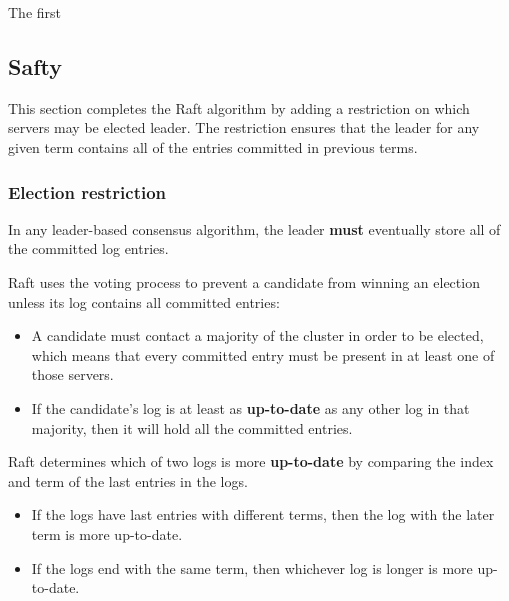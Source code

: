 \documentclass[11pt]{article}
\begin{document}
The first 
\subsection{Safty}
\label{sec:orge075e70}
This section completes the Raft algorithm by adding a restriction on which servers may be elected
leader. The restriction ensures that the leader for any given term contains all of the entries committed in previous terms.
\subsubsection{Election restriction}
\label{sec:orgd98c07f}
In any leader-based consensus algorithm, the leader \textbf{must} eventually store all of the committed log
entries.

Raft uses the voting process to prevent a candidate from winning an election unless its log contains
all committed entries:
\begin{itemize}
\item A candidate must contact a majority of the cluster in order to be elected, which means that every committed entry must be present in at least one of those servers.
\item If the candidate’s log is at least as \textbf{up-to-date} as any other log in that majority, then it will
hold all the committed entries.
\end{itemize}

Raft determines which of two logs is more \textbf{up-to-date} by comparing the index and term of the last
entries in the logs.
\begin{itemize}
\item If the logs have last entries with different terms, then the log with the later term is more up-to-date.
\item If the logs end with the same term, then whichever log is longer is more up-to-date.
\end{itemize}
\end{document}
